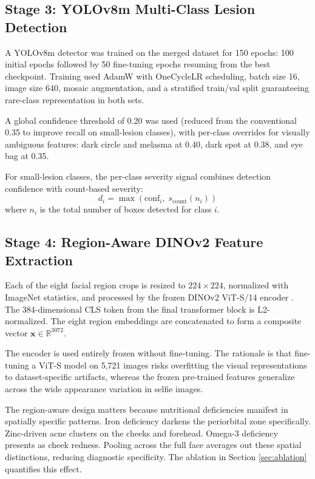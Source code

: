 \documentclass[journal]{IEEEtran}
\begin{document}
\subsection{Stage 3: YOLOv8m Multi-Class Lesion Detection}

A YOLOv8m detector \cite{jocher2023} was trained on the merged dataset for
150 epochs: 100 initial epochs followed by 50 fine-tuning epochs resuming
from the best checkpoint. Training used AdamW with OneCycleLR scheduling,
batch size 16, image size 640, mosaic augmentation, and a stratified train/val
split guaranteeing rare-class representation in both sets.

A global confidence threshold of 0.20 was used (reduced from the conventional
0.35 to improve recall on small-lesion classes), with per-class overrides for
visually ambiguous features: dark circle and melasma at 0.40, dark spot at 0.38,
and eye bag at 0.35.

For small-lesion classes, the per-class severity signal combines detection
confidence with count-based severity:
\begin{equation}
d_i = \max\!\left(\text{conf}_i,\;s_{\text{count}}(n_i)\right)
\label{eq:det_sev}
\end{equation}
where $n_i$ is the total number of boxes detected for class $i$.

\subsection{Stage 4: Region-Aware DINOv2 Feature Extraction}

Each of the eight facial region crops is resized to $224 \times 224$,
normalized with ImageNet statistics, and processed by the frozen DINOv2
ViT-S/14 encoder \cite{oquab2024}. The 384-dimensional CLS token from the
final transformer block is L2-normalized. The eight region embeddings are
concatenated to form a composite vector $\mathbf{x} \in \mathbb{R}^{3072}$.

The encoder is used entirely frozen without fine-tuning. The rationale is that
fine-tuning a ViT-S model on 5{,}721 images risks overfitting the visual
representations to dataset-specific artifacts, whereas the frozen pre-trained
features generalize across the wide appearance variation in selfie images.

The region-aware design matters because nutritional deficiencies manifest in
spatially specific patterns. Iron deficiency darkens the periorbital zone
specifically. Zinc-driven acne clusters on the cheeks and forehead.
Omega-3 deficiency presents as cheek redness. Pooling across the full face
averages out these spatial distinctions, reducing diagnostic specificity.
The ablation in Section \ref{sec:ablation} quantifies this effect.
\end{document}
